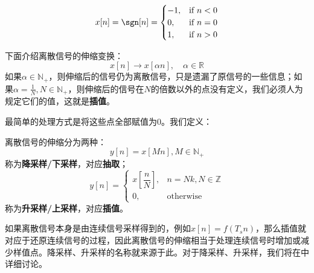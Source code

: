 \begin{definition}[符号序列]
    $$x[n]=\sgn[n]=\begin{cases}
            -1, & \text{if }n<0 \\
            0,  & \text{if }n=0 \\
            1,  & \text{if }n>0
        \end{cases}$$
\end{definition}

下面介绍离散信号的伸缩变换：
$$x[n]\to x[\alpha n],\quad \alpha\in\mathbb{R}$$
如果$\alpha\in\mathbb{N}_+$，则伸缩后的信号仍为离散信号，只是遗漏了原信号的一些信息；如果$\alpha=\frac{1}{N},N\in\mathbb{N}_+$，则伸缩后的信号在$N$的倍数以外的点没有定义，我们必须人为规定它们的值，这就是\textbf{插值}。

最简单的处理方式是将这些点全部赋值为0。我们定义：
\begin{definition}[离散信号的伸缩]
    离散信号的伸缩分为两种：$$y[n]=x[Mn],M\in\mathbb{N}_+$$
    称为\textbf{降采样/下采样}，对应\textbf{抽取}；$$y[n]=\begin{cases}
            x\left[\dfrac{n}{N}\right], & n=Nk,N\in\mathbb{Z} \\
            0,                          & \mathrm{otherwise}
        \end{cases}$$
    称为\textbf{升采样/上采样}，对应\textbf{插值}。
\end{definition}

如果离散信号本身是由连续信号采样得到的，例如$x[n]=f(T_s n)$，那么插值就对应于还原连续信号的过程，因此离散信号的伸缩相当于处理连续信号时增加或减少样值点。降采样、升采样的名称就来源于此。对于降采样、升采样，我们将在中详细讨论。